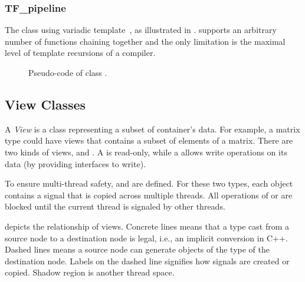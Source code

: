 
\subsubsection{TF\_pipeline}
The  class using variadic template~\cite{vartemp}, as
illustrated in .  supports an arbitrary
number of functions chaining together and the only limitation is the maximal
level of template recursions of a compiler.


\begin{figure}[hbt]
  \caption{Pseudo-code of class .}
  \label{fig:pipeline:code}
\end{figure}


\subsection{View Classes}
\label{sec:view}

A \emph{View} is a class representing a subset of container's data. For example,
a matrix type could have views that contains a subset of elements of a matrix.
There are two kinds of views,  and .
A  is read-only, while a  allows write operations on its data
(by providing interfaces to write). 

To ensure multi-thread safety,  and  are
defined. For these two types, each object contains a signal that is copied across multiple
threads. All operations of  or  are blocked until the
current thread is signaled by other threads.

 depicts the relationship of views. Concrete lines means that
a type cast from a source node to a destination node is legal, i.e., an implicit
conversion in C++.  Dashed lines means a source node can generate objects of
the type of the destination node. Labels on the dashed line signifies how
signals are created or copied.
Shadow region is another thread space.

